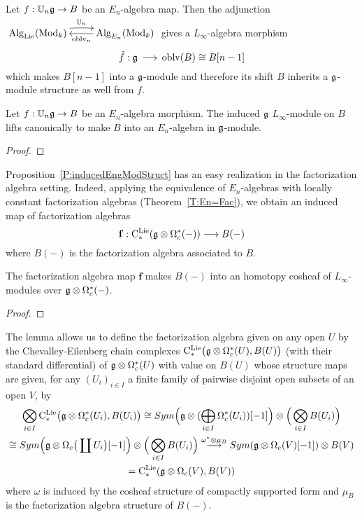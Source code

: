 \documentclass[11pt]{amsart}
\numberwithin{equation}{section}
\begin{document}
Let  $f:\mathbb U_n \mathfrak g \to B$ be an $E_n$-algebra map. Then the adjunction 
$\xymatrix{\Alg_\Lie(\Mod_k) \ar@/^/[r]^{\UU_n} & \ar[l]^{\oblv_n}  \Alg_{E_n}(\Mod_k)}$
gives a $L_\infty$-algebra morphism 
\begin{equation}
 \tilde{f}: \mathfrak g \, \longrightarrow \, {\rm oblv}(B)\cong B[n-1]
\end{equation}
which makes $B[n-1]$ into a $\mathfrak g$-module and therefore its shift $B$ inherits a  $\mathfrak g$-module structure as well from $f$.
\begin{prp}\label{P:inducedEngModStruct} Let $f:\mathbb U_n \mathfrak g \to B$ be an $E_n$-algebra morphism. The induced  
 $\mathfrak g$ $L_\infty$-module on $B$ lifts canonically to make  $B$ into an $E_n$-algebra in $\mathfrak g$-module. 
\end{prp}
\begin{proof}
 
\end{proof}
Proposition~\ref{P:inducedEngModStruct} has an easy realization in the factorization algebra setting.
Indeed, applying the equivalence of $E_n$-algebras with locally constant factorization algebras (Theorem~\ref{T:En=Fac}), 
we obtain an induced map of factorization 
algebras 
\begin{equation}\label{eq:DefofFonFaclevel}
 \mathbf{f}: {\rm C}^{\rm Lie}_*( \mathfrak g \otimes \Omega^*_c(-)) \longrightarrow B(-)
\end{equation}
 where $B(-)$ is the factorization algebra associated to $B$.
\begin{lmm}\label{L:inducedFacgModstruct} The factorization algebra map  $\mathbf{f}$ makes $B(-)$ into an homotopy cosheaf of $L_\infty$-modules over 
 $\mathfrak g \otimes \Omega^*_c(-)$.
\end{lmm}
\begin{proof}
 
\end{proof}
The lemma allows us to define the factorization algebra given on any open $U$ by  the Chevalley-Eilenberg chain complexes
$ {\rm C}^{\rm Lie}_*\big(\mathfrak g \otimes \Omega^*_c(U), B(U) \big)$ (with their standard differential)
of $\mathfrak g \otimes \Omega^*_c(U)$ with value on $B(U)$ whose structure maps are given, for any $(U_i)_{i\in I}$ 
a finite family of pairwise disjoint open subsets of an open $V$, by 
\begin{multline}\label{eq:transClieFac}
 \bigotimes_{i\in I} {\rm C}^{\rm Lie}_*\big(\mathfrak g \otimes \Omega^*_c(U_i), B(U_i) \big) \cong Sym\Big(
 \mathfrak g\otimes (\bigoplus_{i\in I}  \Omega^*_c(U_i))[-1]  \Big) \otimes \Big( \bigotimes_{i\in I} B(U_i)\Big) \\ 
 \cong Sym\Big(\mathfrak g\otimes \Omega_c\big(\coprod U_i\big)[-1] \Big) \otimes \Big( \bigotimes_{i\in I} B(U_i)\Big)  
 \stackrel{\omega^*\otimes \mu_B}\longrightarrow Sym(\mathfrak g\otimes \Omega_c(V)[-1] ) \otimes B(V) \\ 
 = {\rm C}^{\rm Lie}_*(\mathfrak g\otimes \Omega_c(V), B(V))
\end{multline}
where $\omega$ is induced by the cosheaf structure of compactly supported form and $\mu_B$ is the factorization algebra structure of $B(-)$.
\end{document}
